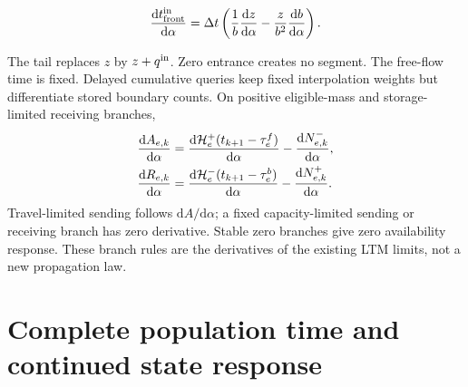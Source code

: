 \documentclass[10pt,a4paper]{article}
\newenvironment{revision}{\begingroup\color{revisionred}}{\par\endgroup}
\begin{document}
\begin{revision}
\begin{equation}
 \frac{\mathrm dt^{\rm in}_{\rm front}}{\mathrm d\alpha}
 =\Delta t\left(\frac1b\frac{\mathrm dz}{\mathrm d\alpha}
       -\frac z{b^2}\frac{\mathrm db}{\mathrm d\alpha}\right).
 \label{eq:entry-derivative}
\end{equation}

The tail replaces $z$ by $z+q^{\rm in}$. Zero entrance creates no segment.
The free-flow time is fixed. Delayed cumulative queries keep fixed
interpolation weights but differentiate stored boundary counts. On
positive eligible-mass and storage-limited receiving branches,
\begin{equation}
 \begin{aligned}
 \frac{\mathrm dA_{e,k}}{\mathrm d\alpha}
 &=\frac{\mathrm d{\cal H}^+_e(t_{k+1}-\tau^f_e)}{\mathrm d\alpha}
                     -\frac{\mathrm dN^-_{e,k}}{\mathrm d\alpha},\\
 \frac{\mathrm dR_{e,k}}{\mathrm d\alpha}
 &=\frac{\mathrm d{\cal H}^-_e(t_{k+1}-\tau^b_e)}{\mathrm d\alpha}
                     -\frac{\mathrm dN^+_{e,k}}{\mathrm d\alpha}.
 \end{aligned}
 \label{eq:ltm-derivative}
\end{equation}
Travel-limited sending follows $\mathrm dA/\mathrm d\alpha$; a fixed
capacity-limited sending or receiving branch has zero derivative.
Stable zero branches give zero availability response. These branch rules
are the derivatives of the existing LTM limits, not a new propagation law.
\end{revision}

\section{Complete population time and continued state response}
\end{document}
